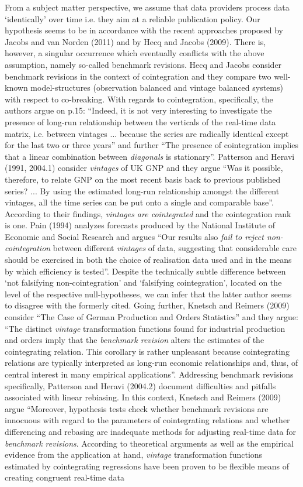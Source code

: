 \documentclass[11pt]{article}
\begin{document}
From a subject matter perspective,  we assume that data providers process data `identically' over time i.e. they aim at a reliable publication policy. Our hypothesis seems to be in accordance with the recent approaches proposed by Jacobs and van Norden (2011) and by Hecq and Jacobs (2009). There is, however, a singular occurrence which eventually conflicts with the above assumption, namely so-called benchmark revisions. Hecq and Jacobs consider benchmark revisions in the context of cointegration and they compare two well-known model-structures (observation balanced and vintage balanced systems) with respect to co-breaking. With regards to cointegration, specifically, the authors argue on p.15: ``Indeed,
it is not very interesting to investigate the presence of long-run relationship between the verticals of the real-time data matrix, i.e. between vintages ... because the series are radically identical except for the last two or three years'' and further ``The presence of cointegration implies that a linear combination between \emph{diagonals} is stationary''. Patterson and Heravi (1991, 2004.1) consider \emph{vintages} of UK GNP and they argue ``Was it possible, therefore, to relate GNP on the most recent basis back to previous published series? ... By using the estimated long-run relationship amongst the different vintages, all the time series can be put onto a single and comparable base''. According to their findings, \emph{vintages are cointegrated} and the cointegration rank is one. Pain (1994) analyzes forecasts produced by the National Institute of Economic and Social Research and argues ``Our results also \emph{fail to reject non-cointegration} between different \emph{vintages} of data, suggesting that considerable care should be exercised in both the choice of realisation data used and in the means by which efficiency is tested''. Despite the technically subtle difference between `not falsifying non-cointegration' and `falsifying cointegration', located on the level of the respective null-hypotheses, we can infer that the latter author seems to disagree with the formerly cited. Going further, Knetsch and Reimers (2009) consider ``The Case of German Production and Orders Statistics'' and they argue: ``The distinct \emph{vintage} transformation functions found for industrial production and orders imply that the \emph{benchmark revision} alters the estimates of the cointegrating relation. This corollary is rather unpleasant because cointegrating relations are typically interpreted as long-run economic relationships and, thus, of central interest in many empirical applications''. Addressing benchmark revisions specifically, Patterson and Heravi (2004.2) document difficulties and pitfalls associated with linear rebiasing. In this context, Knetsch and Reimers (2009) argue ``Moreover, hypothesis tests check whether benchmark revisions are innocuous with regard to the parameters of cointegrating relations and whether differencing and rebasing are inadequate methods for adjusting real-time data for \emph{benchmark revisions}. According to theoretical arguments as well as the empirical evidence from the application at hand, \emph{vintage} transformation functions estimated by cointegrating regressions have been proven to be flexible means of creating congruent real-time data 
\end{document}
